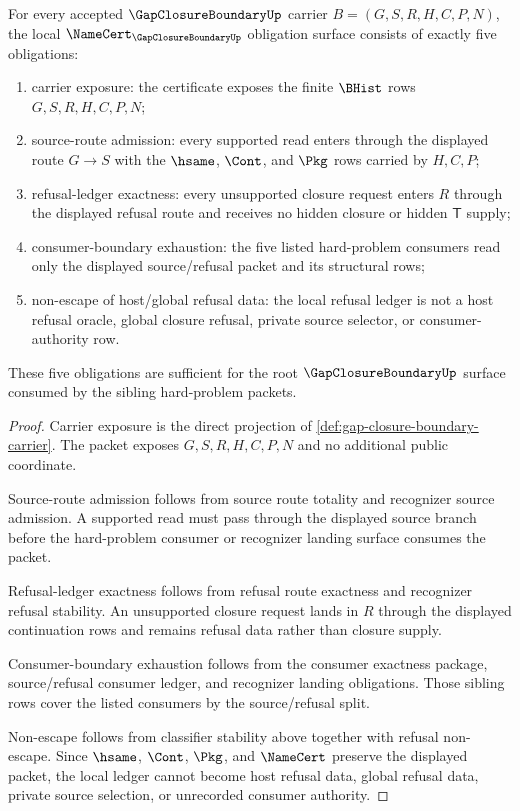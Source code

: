 \begin{theorem}
\label{thm:gap-closure-boundary-namecert-obligation-surface}
For every accepted $\GapClosureBoundaryUp$ carrier $B=(G,S,R,H,C,P,N)$, the local $\NameCert_{\GapClosureBoundaryUp}$ obligation surface consists of exactly five obligations:
\begin{enumerate}
\item carrier exposure: the certificate exposes the finite $\BHist$ rows $G,S,R,H,C,P,N$;
\item source-route admission: every supported read enters through the displayed route $G \longrightarrow S$ with the $\hsame$, $\Cont$, and $\Pkg$ rows carried by $H,C,P$;
\item refusal-ledger exactness: every unsupported closure request enters $R$ through the displayed refusal route and receives no hidden closure or hidden $\mathsf{T}$ supply;
\item consumer-boundary exhaustion: the five listed hard-problem consumers read only the displayed source/refusal packet and its structural rows;
\item non-escape of host/global refusal data: the local refusal ledger is not a host refusal oracle, global closure refusal, private source selector, or consumer-authority row.
\end{enumerate}
These five obligations are sufficient for the root $\GapClosureBoundaryUp$ surface consumed by the sibling hard-problem packets.
\end{theorem}
\begin{proof}
Carrier exposure is the direct projection of \autoref{def:gap-closure-boundary-carrier}. The packet exposes $G,S,R,H,C,P,N$ and no additional public coordinate.

Source-route admission follows from source route totality and recognizer source admission. A supported read must pass through the displayed source branch before the hard-problem consumer or recognizer landing surface consumes the packet.

Refusal-ledger exactness follows from refusal route exactness and recognizer refusal stability. An unsupported closure request lands in $R$ through the displayed continuation rows and remains refusal data rather than closure supply.

Consumer-boundary exhaustion follows from the consumer exactness package, source/refusal consumer ledger, and recognizer landing obligations. Those sibling rows cover the listed consumers by the source/refusal split.

Non-escape follows from classifier stability above together with refusal non-escape. Since $\hsame$, $\Cont$, $\Pkg$, and $\NameCert$ preserve the displayed packet, the local ledger cannot become host refusal data, global refusal data, private source selection, or unrecorded consumer authority.
\end{proof}
